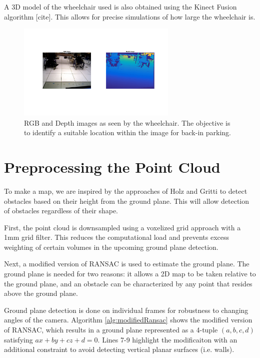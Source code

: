 A 3D model of the wheelchair used is also obtained using the Kinect Fusion
algorithm [cite]. This allows for precise simulations of how large the
wheelchair is.

\begin{figure}
\centering
\includegraphics[width=3in]{figures/rgbdwheelchair.png}
\caption{RGB and Depth images as seen by the wheelchair. The objective is to
identify a suitable location within the image for back-in parking.}
\label{fig:rgbdwheelchair}
\end{figure}


\section{Preprocessing the Point Cloud}
\label{sec:processingPointCloud}

To make a map, we are inspired by the approaches of Holz \cite{holz2013towards}
and Gritti \cite{gritti2014kinect} to detect obstacles based on their height
from the ground plane. This will allow detection of obstacles regardless of
their shape.

First, the point cloud is downsampled using a voxelized grid approach with a 1mm
grid filter. This reduces the computational load and prevents excess weighting of
certain volumes in the upcoming ground plane detection.

Next, a modified version of RANSAC is used to estimate the ground plane. The
ground plane is needed for two reasons:
it allows a 2D map to be taken relative to the ground plane, and an obstacle can
be characterized by any point that resides above the ground plane.

Ground plane detection is done on individual frames for robustness to changing
angles of the camera.
Algorithm \autoref{alg:modifiedRansac} shows the modified version of RANSAC,
which results in a ground plane represented as a 4-tuple $(a,b,c,d)$ satisfying
$ax + by + cz + d = 0$. Lines 7-9 highlight the modificaiton with an additional
constraint to avoid detecting vertical planar surfaces (i.e. walls).


